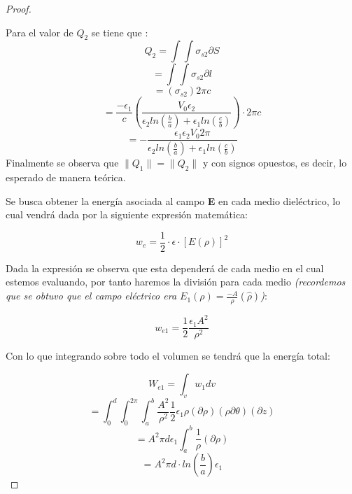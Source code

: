 \begin{proof}
\begin{enumerate}
\begin{equation}
    \end{equation}
    Para el valor de $Q_{2}$ se tiene que :
    \begin{equation}
        Q_{2} = \int\int \sigma_{s2} \partial S
    \end{equation}
    \begin{equation}
        = \int\int \sigma_{s2} \partial l
    \end{equation}
    \begin{equation}
        = (\sigma_{s2}) 2\pi c
    \end{equation}
    \begin{equation}
        =\frac{-\epsilon_{1}}{c}\left(\frac{V_{0} \epsilon_{2}}{\epsilon_{2}ln(\frac{b}{a}) + \epsilon_{1} ln(\frac{c}{b})}\right) \cdot 2\pi c
    \end{equation}
    \begin{equation}
        = -\frac{\epsilon_{1}\epsilon_{2}V_{0}  2\pi}{\epsilon_{2}ln(\frac{b}{a}) + \epsilon_{1} ln(\frac{c}{b})}
    \end{equation}
    Finalmente se observa que $\|Q_{1}\| =\|Q_{2}\|$ y con signos opuestos, es decir, lo esperado de manera teórica.
    \end{enumerate}
    \item Se busca obtener la energía asociada al campo \textbf{E} en cada medio dieléctrico, lo cual vendrá dada por la siguiente expresión matemática:

    \begin{equation}
        w_{e} = \frac{1}{2}\cdot \epsilon \cdot [E(\rho)]^{2} 
    \end{equation}
    
    Dada la expresión se observa que esta dependerá de cada medio en el cual estemos evaluando, por tanto haremos la división para cada medio \textit{(recordemos que se obtuvo que el campo eléctrico era $E_{1}(\rho) = \frac{-A}{\rho}(\hat{\rho})$)}:
    
    \begin{equation}
        w_{e1} = \frac{1}{2}\frac{\epsilon_{1}A^{2}}{\rho^{2}}
    \end{equation}
    
    Con lo que integrando sobre todo el volumen se tendrá que la energía total:
    
    \begin{equation}
        W_{e1} =\int_{v} w_{1}dv
    \end{equation}
    \begin{equation}
        =\int_{0}^{d}  \int_{0}^{2\pi} \int_{a}^{b}\frac{A^{2}}{\rho^{2}} \frac{1}{2}\epsilon_{1} \rho(\partial\rho )(\rho \partial\theta)( \partial z)
    \end{equation}
    \begin{equation}
        = A^{2} \pi d\epsilon_{1} \int_{a}^{b} \frac{1}{\rho} (\partial\rho)
    \end{equation}
    \begin{equation}
        = A^{2}\pi  d \cdot ln\left(\frac{b}{a}\right) \epsilon_{1}
    \end{equation}
    

\end{proof}
